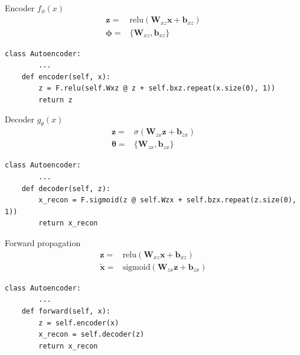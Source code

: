\documentclass{beamer}
\newcommand{\relu}{\mathrm{relu}}
\newcommand{\sig}{\mathrm{sigmoid}}
\begin{document}
\begin{frame}[fragile]{Encoder $f_\phi(x)$}
\begin{align}
	\mathbf{z} =& \relu\left(\mathbf{W}_{xz}\mathbf{x}+\mathbf{b}_{xz}\right)\\
	\bm{\phi}=&\{\mathbf{W}_{xz}, \mathbf{b}_{xz}\} 
\end{align}
\begin{verbatim}
class Autoencoder:
        ...
    def encoder(self, x):
        z = F.relu(self.Wxz @ z + self.bxz.repeat(x.size(0), 1))
        return z
\end{verbatim}
\end{frame}

\begin{frame}[fragile]{Decoder $g_\theta(x)$}
\begin{align}
	\mathbf{z} 
	=& \sigma\left(\mathbf{W}_{zx}\mathbf{z}+\mathbf{b}_{zx}\right)\\
\bm{\theta}=&\{\mathbf{W}_{zx}, \mathbf{b}_{zx}\} 
\end{align}
\begin{verbatim}
class Autoencoder:
        ...
    def decoder(self, z):
        x_recon = F.sigmoid(z @ self.Wzx + self.bzx.repeat(z.size(0), 1))
        return x_recon
\end{verbatim}
\end{frame}

\begin{frame}[fragile]{Forward propagation}
\begin{equation}
\begin{split}
\mathbf{z} =& \relu\left(\mathbf{W}_{xz}\mathbf{x}+\mathbf{b}_{xz}\right)\\
\tilde{\mathbf{x}} =& \sig\left(\mathbf{W}_{zx}\mathbf{z}+\mathbf{b}_{zx}\right) 
\end{split}
\end{equation}
\begin{verbatim}
class Autoencoder:
        ...
    def forward(self, x):
        z = self.encoder(x)
        x_recon = self.decoder(z)
        return x_recon
\end{verbatim}
\end{frame}
\end{document}
